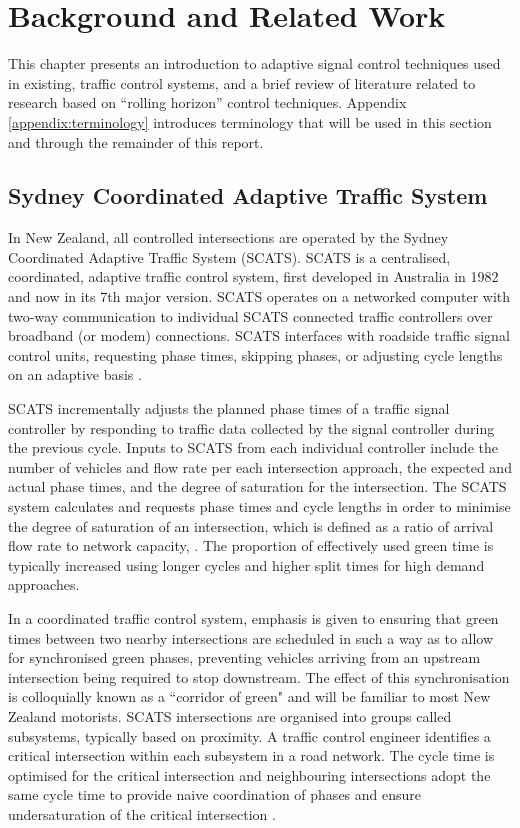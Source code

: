 \chapter{Background and Related Work}

This chapter presents an introduction to adaptive signal control techniques used in existing, traffic control systems, and a brief review of literature related to research based on ``rolling horizon'' control techniques. Appendix \ref{appendix:terminology} introduces terminology that will be used in this section and through the remainder of this report. 

\section{Sydney Coordinated Adaptive Traffic System}

In New Zealand, all controlled intersections are operated by the Sydney Coordinated Adaptive Traffic System (SCATS). SCATS is a centralised, coordinated, adaptive traffic control system, first developed in Australia in 1982 and now in its 7th major version. SCATS operates on a networked computer with two-way communication to individual SCATS connected traffic controllers over broadband (or modem) connections. SCATS interfaces with roadside traffic signal control units, requesting phase times, skipping phases, or adjusting cycle lengths on an adaptive basis \cite{scatstraining,lowrie1982scats}.

SCATS incrementally adjusts the planned phase times of a traffic signal controller by responding to traffic data collected by the signal controller during the previous cycle. Inputs to SCATS from each individual controller include the number of vehicles and flow rate per each intersection approach, the expected and actual phase times, and the degree of saturation for the intersection.  The SCATS system calculates and requests phase times and cycle lengths in order to minimise the degree of saturation of an intersection, which is defined as a ratio of arrival flow rate to network capacity, \cite{sidraglossary}. The proportion of effectively used green time is typically increased using longer cycles and higher split times for high demand approaches. 

In a coordinated traffic control system, emphasis is given to ensuring that green times between two nearby intersections are scheduled in such a way as to allow for synchronised green phases, preventing vehicles arriving from an upstream intersection being required to stop downstream. The effect of this synchronisation is colloquially known as a ``corridor of green" and will be familiar to most New Zealand motorists. SCATS intersections are organised into groups called subsystems, typically based on proximity. A traffic control engineer identifies a critical intersection within each subsystem in a road network. The cycle time is optimised for the critical intersection and neighbouring intersections adopt the same cycle time to provide naive coordination of phases and ensure undersaturation of the critical intersection \cite{kilby2010rta}.

